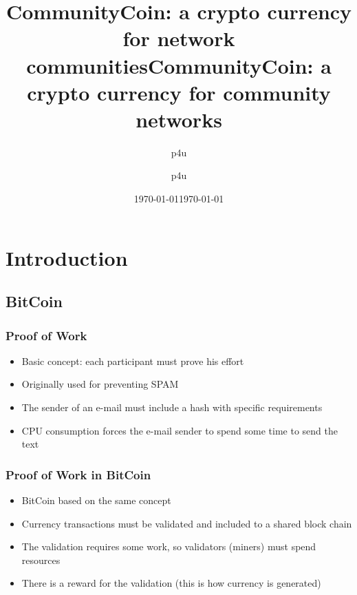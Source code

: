\documentclass[usepdftitle=false,13pt]{beamer}
\title[CommunityCoin: a crypto currency for network communities]{CommunityCoin: a crypto currency for network communities}
\author[{p4u}]{p4u}
\institute[{guifi.net}]{guifi.net}
\date[\today]{\today}
\begin{document}
\title[CommunityCoin\hspace{20em}\insertframenumber/\inserttotalframenumber]{CommunityCoin: a crypto currency for community networks}  
\author[p4u]{ p4u\\
 }

\date{\today} 

\frame{\titlepage}




\section{Introduction}
\subsection{BitCoin}



\begin{frame}\frametitle{Proof of Work}
	\begin{itemize}
		\item Basic concept: each participant must prove his effort
		
		\item Originally used for preventing SPAM 
		
		\item  The sender of an e-mail must include a hash with specific requirements
	
		\item CPU consumption forces the e-mail sender to spend some time to send the text
	\end{itemize}
\end{frame}

\begin{frame}\frametitle{Proof of Work in BitCoin}
	\begin{itemize}
		\item BitCoin based on the same concept
		\item Currency transactions must be validated and included to a shared block chain
		\item The validation requires some work, so validators (miners) must spend resources
		\item There is a reward for the validation (this is how currency is generated)
	\end{itemize}
\end{frame}
\end{document}
